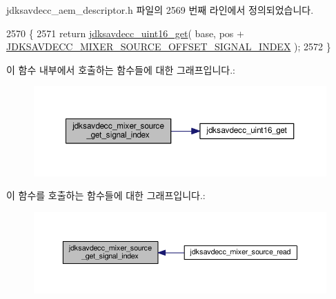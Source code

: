 jdksavdecc\+\_\+aem\+\_\+descriptor.\+h 파일의 2569 번째 라인에서 정의되었습니다.


\begin{DoxyCode}
2570 \{
2571     \textcolor{keywordflow}{return} \hyperlink{group__endian_ga3fbbbc20be954aa61e039872965b0dc9}{jdksavdecc\_uint16\_get}( base, pos + 
      \hyperlink{group__mixer__source_gade62772295522262439a273bad503930}{JDKSAVDECC\_MIXER\_SOURCE\_OFFSET\_SIGNAL\_INDEX} );
2572 \}
\end{DoxyCode}


이 함수 내부에서 호출하는 함수들에 대한 그래프입니다.\+:
\nopagebreak
\begin{figure}[H]
\begin{center}
\leavevmode
\includegraphics[width=350pt]{group__mixer__source_ga187ed6716ddc7ac02e90e8119f906e5a_cgraph}
\end{center}
\end{figure}




이 함수를 호출하는 함수들에 대한 그래프입니다.\+:
\nopagebreak
\begin{figure}[H]
\begin{center}
\leavevmode
\includegraphics[width=350pt]{group__mixer__source_ga187ed6716ddc7ac02e90e8119f906e5a_icgraph}
\end{center}
\end{figure}


